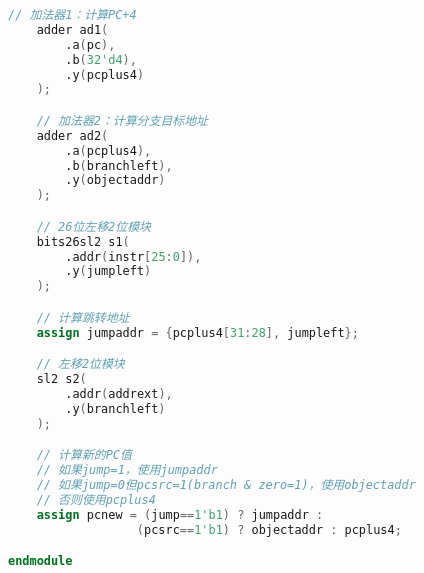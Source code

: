 \begin{lstlisting}[language=Verilog]
    // 加法器1：计算PC+4
    adder ad1(
        .a(pc),
        .b(32'd4),
        .y(pcplus4)
    );

    // 加法器2：计算分支目标地址
    adder ad2(
        .a(pcplus4),
        .b(branchleft),
        .y(objectaddr)
    );

    // 26位左移2位模块
    bits26sl2 s1(
        .addr(instr[25:0]),
        .y(jumpleft)
    );

    // 计算跳转地址
    assign jumpaddr = {pcplus4[31:28], jumpleft};

    // 左移2位模块
    sl2 s2(
        .addr(addrext),
        .y(branchleft)
    );

    // 计算新的PC值
    // 如果jump=1，使用jumpaddr
    // 如果jump=0但pcsrc=1(branch & zero=1)，使用objectaddr
    // 否则使用pcplus4
    assign pcnew = (jump==1'b1) ? jumpaddr : 
                  (pcsrc==1'b1) ? objectaddr : pcplus4;

endmodule
\end{lstlisting}

